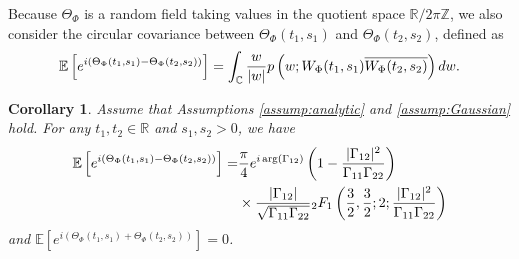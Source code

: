 \documentclass{amsart}
\newtheorem{Corollary}{Corollary}
\begin{document}
Because $\Theta_{\Phi}$ is a random field taking values in the quotient space $\mathbb{R}/2\pi \mathbb{Z}$,
we also consider the circular covariance between $\Theta_{\Phi}(t_{1},s_{1})$ and $\Theta_{\Phi}(t_{2},s_{2})$,
defined as
\begin{align}\notag
\mathbb{E}\left[e^{i(\Theta_{\Phi}(t_{1},s_{1})-\Theta_{\Phi}(t_{2},s_{2}))}\right]
= \int_{\mathbb{C}}\frac{w}{|w|}p\left(w;W_{\Phi}(t_{1},s_{1})\overline{W_{\Phi}(t_{2},s_{2})}\right)dw.
\end{align}






\begin{Corollary}\label{prop:Cov_phase_null}
Assume that Assumptions \ref{assump:analytic} and \ref{assump:Gaussian} hold.
For any $t_{1},t_{2}\in \mathbb{R}$ and $s_{1},s_{2}>0$, we have
\begin{align}\notag
\mathbb{E}\left[e^{i(\Theta_{\Phi}(t_{1},s_{1})-\Theta_{\Phi}(t_{2},s_{2}))}\right]
=&\frac{\pi}{4}e^{i\arg\left(\Gamma_{12}\right)}
\left(1-\frac{|\Gamma_{12}|^{2}}{\Gamma_{11}\Gamma_{22}}\right)
\\\label{phase_cov_null_result}&\times\frac{|\Gamma_{12}|}{\sqrt{\Gamma_{11}\Gamma_{22}}}
{}_2F_1\left(\frac{3}{2},\frac{3}{2};2;\frac{|\Gamma_{12}|^{2}}{\Gamma_{11}\Gamma_{22}}\right)
\end{align}
and $\mathbb{E}\left[e^{i(\Theta_{\Phi}(t_{1},s_{1})+\Theta_{\Phi}(t_{2},s_{2}))}\right]=0$.
\end{Corollary}
\end{document}
